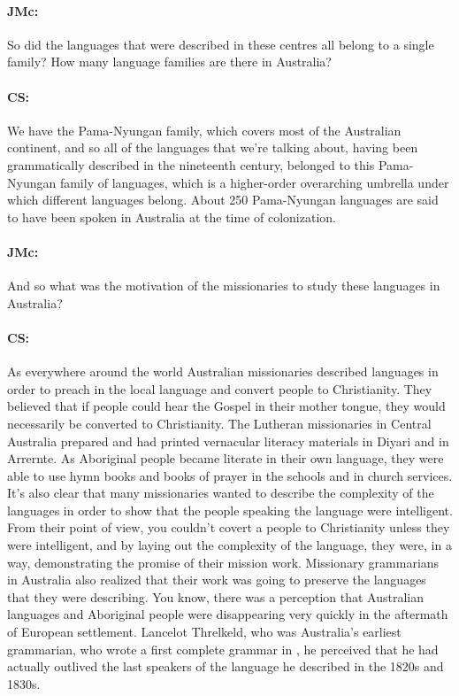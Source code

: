 \documentclass[output=paper]{langscibook}
\begin{document}
\paragraph*{JMc:}  So did the languages that were described in these centres all belong to a single family? How many language families are there in Australia?


\paragraph*{CS:}  We have the Pama-Nyungan family, which covers most of the Australian continent, and so all of the languages that we’re talking about, having been grammatically described in the nineteenth century, belonged to this Pama-Nyungan family of languages, which is a higher-order overarching umbrella under which different languages belong. About 250 Pama-Nyungan languages are said to have been spoken in Australia at the time of colonization.


\paragraph*{JMc:}  And so what was the motivation of the missionaries to study these languages in Australia?


\paragraph*{CS:}  As everywhere around the world Australian missionaries described languages in order to preach in the local language and convert people to Christianity. They believed that if people could hear the Gospel in their mother tongue, they would necessarily be converted to Christianity. The Lutheran missionaries in Central Australia prepared and had printed vernacular literacy materials in Diyari and in Arrernte. As Aboriginal people became literate in their own language, they were able to use hymn books and books of prayer in the schools and in church services. It’s also clear that many missionaries wanted to describe the complexity of the languages in order to show that the people speaking the language were intelligent. From their point of view, you couldn’t covert a people to Christianity unless they were intelligent, and by laying out the complexity of the language, they were, in a way, demonstrating the promise of their mission work. Missionary grammarians in Australia also realized that their work was going to preserve the languages that they were describing. You know, there was a perception that Australian languages and Aboriginal people were disappearing very quickly in the aftermath of European settlement. Lancelot Threlkeld, who was Australia’s earliest grammarian, who wrote a first complete grammar in \citeyear{threlkeld1834a}, he perceived that he had actually outlived the last speakers of the language he described in the 1820s and 1830s.
\end{document}
